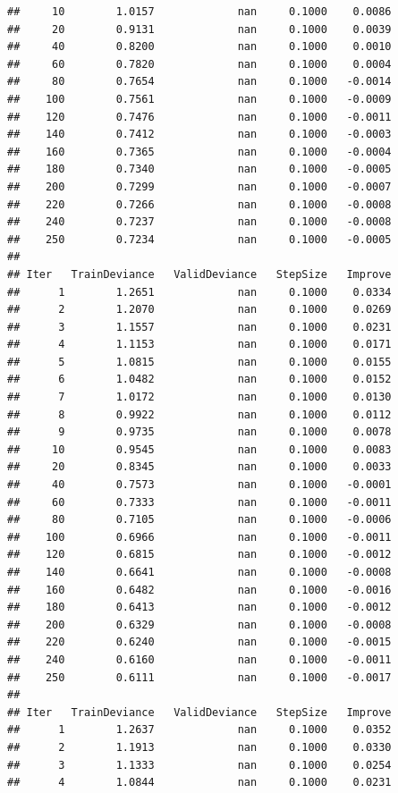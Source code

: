 \documentclass[
]{book}
\begin{document}
\begin{verbatim}
##     10        1.0157             nan     0.1000    0.0086
##     20        0.9131             nan     0.1000    0.0039
##     40        0.8200             nan     0.1000    0.0010
##     60        0.7820             nan     0.1000    0.0004
##     80        0.7654             nan     0.1000   -0.0014
##    100        0.7561             nan     0.1000   -0.0009
##    120        0.7476             nan     0.1000   -0.0011
##    140        0.7412             nan     0.1000   -0.0003
##    160        0.7365             nan     0.1000   -0.0004
##    180        0.7340             nan     0.1000   -0.0005
##    200        0.7299             nan     0.1000   -0.0007
##    220        0.7266             nan     0.1000   -0.0008
##    240        0.7237             nan     0.1000   -0.0008
##    250        0.7234             nan     0.1000   -0.0005
## 
## Iter   TrainDeviance   ValidDeviance   StepSize   Improve
##      1        1.2651             nan     0.1000    0.0334
##      2        1.2070             nan     0.1000    0.0269
##      3        1.1557             nan     0.1000    0.0231
##      4        1.1153             nan     0.1000    0.0171
##      5        1.0815             nan     0.1000    0.0155
##      6        1.0482             nan     0.1000    0.0152
##      7        1.0172             nan     0.1000    0.0130
##      8        0.9922             nan     0.1000    0.0112
##      9        0.9735             nan     0.1000    0.0078
##     10        0.9545             nan     0.1000    0.0083
##     20        0.8345             nan     0.1000    0.0033
##     40        0.7573             nan     0.1000   -0.0001
##     60        0.7333             nan     0.1000   -0.0011
##     80        0.7105             nan     0.1000   -0.0006
##    100        0.6966             nan     0.1000   -0.0011
##    120        0.6815             nan     0.1000   -0.0012
##    140        0.6641             nan     0.1000   -0.0008
##    160        0.6482             nan     0.1000   -0.0016
##    180        0.6413             nan     0.1000   -0.0012
##    200        0.6329             nan     0.1000   -0.0008
##    220        0.6240             nan     0.1000   -0.0015
##    240        0.6160             nan     0.1000   -0.0011
##    250        0.6111             nan     0.1000   -0.0017
## 
## Iter   TrainDeviance   ValidDeviance   StepSize   Improve
##      1        1.2637             nan     0.1000    0.0352
##      2        1.1913             nan     0.1000    0.0330
##      3        1.1333             nan     0.1000    0.0254
##      4        1.0844             nan     0.1000    0.0231

\end{verbatim}
\end{document}
